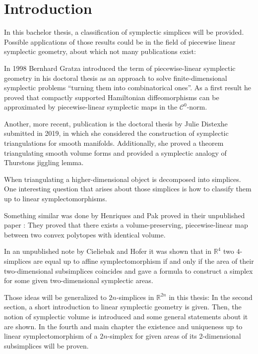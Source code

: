 \documentclass[../SymplecticSimplices.tex]{subfiles}
\begin{document}
\section{Introduction}

In this bachelor thesis, a classification of symplectic simplices will be provided. Possible applications of those results could be in the field of piecewise linear symplectic geometry, about which not many publications exist:

In 1998 Bernhard Gratza introduced the term of piecewise-linear symplectic geometry in his doctoral thesis \cite{gratza} as an approach to solve finite-dimensional symplectic problems ``turning them into combinatorical ones''. As a first result he proved that compactly supported Hamiltonian diffeomorphisms can be approximated by piecewise-linear symplectic maps in the \( \mathcal{C}^0 \)-norm.

Another, more recent, publication is the doctoral thesis by Julie Distexhe \cite{distexhe} submitted in 2019, in which she considered the construction of symplectic triangulations for smooth manifolds. Additionally, she proved a theorem triangulating smooth volume forms and provided a symplectic analogy of Thurstons jiggling lemma.

When triangulating a higher-dimensional object is decomposed into simplices. One interesting question that arises about those simplices is how to classify them up to linear symplectomorphisms.

Something similar was done by Henriques and Pak proved in their unpublished paper \cite{henri}: They proved that there exists a volume-preserving, piecewise-linear map between two convex polytopes with identical volume.

In an unpublished note \cite{cieliebak} by Cieliebak and Hofer it was shown that in \( \mathbb{R}^4 \) two \( 4 \)-simplices are equal up to affine symplectomorphism if and only if the area of their two-dimensional subsimplices coincides and gave a formula to construct a simplex for some given two-dimensional symplectic areas.

Those ideas will be generalized to \( 2n \)-simplices in \( \mathbb{R}^{2n} \) in this thesis: In the second section, a short introduction to linear symplectic geometry is given. Then, the notion of symplectic volume is introduced and some general statements about it are shown. In the fourth and main chapter the existence and uniqueness up to linear symplectomorphism of a \( 2n \)-simplex for given areas of its 2-dimensional subsimplices will be proven.
\end{document}
